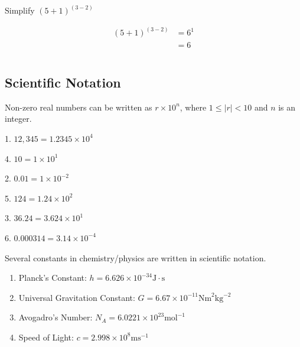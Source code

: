 \documentclass[crop=false,class=book,oneside]{standalone}
\begin{document}
            \hfill
            \begin{minipage}[t]{0.49\textwidth}
                \begin{problem}
                    Simplify $(5+1)^{(3-2)}$
                \end{problem}
                \begin{fsolution}
                    \begin{align*}
                        (5+1)^{(3-2)}&=6^{1}\\
                        &=\boxed{6}\\
                        &\\
                        &
                    \end{align*}
                \end{fsolution}
            \end{minipage}
    \subsection{Scientific Notation}
        Non-zero real numbers can be written as
        ${r}\times{10^{n}}$, where ${1}\leq{|r|}<10$
        and $n$ is an integer.
        \begin{fexample}{}{}
            \begin{enumerate}
                \begin{multicols}{3}
                    \item[1.] $12,\!345={1.2345}\times{10^{4}}$
                    \item[4.] $10={1}\times{10^{1}}$
                    \item[2.] $0.01={1}\times{10^{-2}}$
                    \item[5.] $124={1.24}\times{10^{2}}$
                    \item[3.] $36.24={3.624}\times{10^{1}}$
                    \item[6.] $0.000314={3.14}\times{10^{-4}}$
                \end{multicols}
            \end{enumerate}
            Several constants in chemistry/physics are
            written in scientific notation.
            \begin{enumerate}
                \item Planck's Constant:
                    $h={6.626}\times{10^{-34}}%
                    \textrm{J}\cdot\textrm{s}$
                \item Universal Gravitation Constant:
                    $G={6.67}\times{10^{-11}}%
                    \textrm{Nm}^{2}\textrm{kg}^{-2}$
                \item Avogadro's Number:
                    $N_{A}={6.0221}\times{10^{23}}%
                    \textrm{mol}^{-1}$
                \item Speed of Light:
                    $c={2.998}\times{10^{8}\textrm{ms}^{-1}}$
            \end{enumerate}
        \end{fexample}
\end{document}
